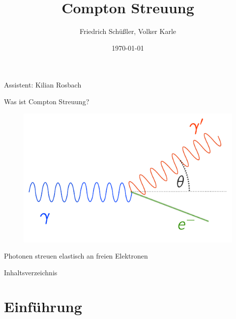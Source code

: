 \documentclass[xcolor=x11names,compress]{beamer}
\renewcommand{\(}{\begin{columns}}
\renewcommand{\)}{\end{columns}}
\newcommand{\<}[1]{\begin{column}{#1}}
\renewcommand{\>}{\end{column}}
\begin{document}
\begin{frame}{}
\title[Compton]{Compton Streuung}
\author{
Friedrich Schüßler, Volker Karle}
\date{\today}
\titlepage

\centering 
Assistent: Kilian Rosbach
\end{frame}

\begin{frame}[t]{Was ist Compton Streuung?}
\begin{figure}[htpb]
    \centering
    \includegraphics[width=0.6\linewidth]{../figures/compton_scatter}
\label{fig:intro}
\end{figure}
Photonen streuen elastisch an freien Elektronen
\end{frame}

\begin{frame}{Inhaltsverzeichnis}
    \tableofcontents
\end{frame}


\section{Einführung}
\begin{frame}[t]{}

\end{frame}
\end{document}
